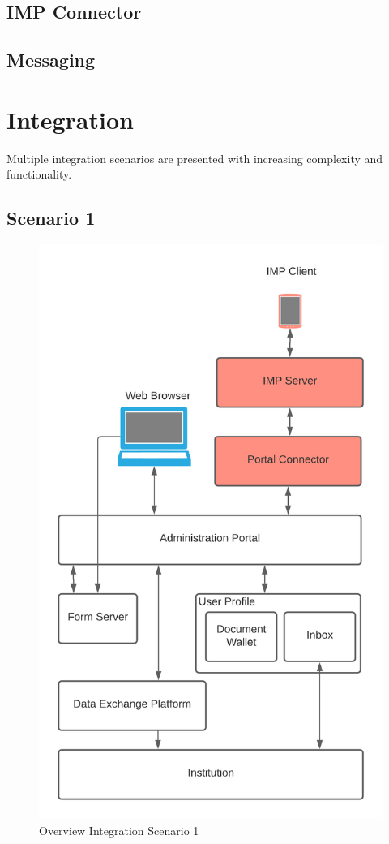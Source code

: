 \documentclass[
     12pt,         %
     a4paper,      %
     BCOR=10mm,version=first,     %
     DIV=14,version=first,        %
     ]{scrreprt}
\begin{document}
\subsection{IMP Connector}

\subsection{Messaging}

\section{Integration}

Multiple integration scenarios are presented with increasing complexity and functionality.

\subsection{Scenario 1}

\begin{figure}[h]
\caption{Overview Integration Scenario 1}
    \centering
    \includegraphics[scale=0.2]{Diagrams/Integration 1/Overview.png}
\end{figure}
\end{document}
